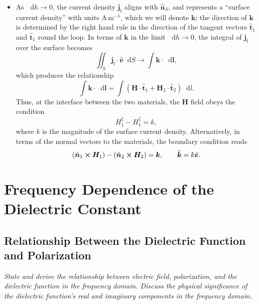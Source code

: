 \documentclass[11pt, a4paper]{article}
\newcommand{\diff}{\mathop{}\!\mathrm{d}} %
\renewcommand{\vec}[1]{\bm{#1}} %
\newcommand{\uvec}[1]{\hat{\vec{#1}}} %
\renewcommand{\H}{\vec{H}}  %
\renewcommand{\j}{\vec{j}}  %
\begin{document}
\begin{itemize}
    \item As $ \diff h \to 0 $, the current density $ \j_{\text{f}} $ aligns with $ \uvec{n}_{S} $, and represents a ``surface current density'' with units $ \si{\ampere \, \meter^{-1}} $, which we will denote $ \vec{k} $; the direction of $ \vec{k} $ is determined by the right hand rule in the direction of the tangent vectors $ \uvec{t}_{1} $ and $ \uvec{t}_{1} $ round the loop. In terms of $ \vec{k} $ in the limit $ \diff h \to 0 $, the integral of $ \j_{\text{f}} $ over the surface becomes
    \begin{equation*}
        \iint_{S} \j_{\text{f}} \cdot \uvec{e} \diff S \to \int \vec{k} \cdot \diff \vec{l},
    \end{equation*}
    which produces the relationship
    \begin{equation*}
        \int \vec{k} \cdot \diff \vec{l} = \int (\H \cdot \uvec{t}_{1} + \H_{2}\cdot \uvec{t}_{2}) \diff l.
    \end{equation*}
    Thus, at the interface between the two materials, the $ \H $ field obeys the condition 
	\begin{equation*}
        H_{1}^{\parallel} - H_{1}^{\parallel} = k,
	\end{equation*}
    where $ k $ is the magnitude of the surface current density. Alternatively, in terms of the normal vectors to the materials, the boundary condition reads
	\begin{equation*}
        (\uvec{n}_{1} \cross \H_{1}) - (\uvec{n}_{2}\cross \H_{2}) = \vec{k}, \qquad \uvec{k} = k \uvec{e}.
	\end{equation*}
\end{itemize}


\newpage
\section{Frequency Dependence of the Dielectric Constant}

\subsection{Relationship Between the Dielectric Function and Polarization}
\textit{State and derive the relationship between electric field, polarization, and the dielectric function in the frequency domain. Discuss the physical significance of the dielectric function's real and imaginary components in the frequency domain.}
\end{document}
